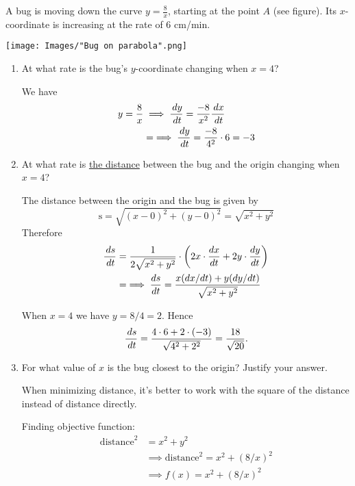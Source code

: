 \documentclass[nooutcomes]{ximera}
\begin{document}
\begin{problem}
  A bug is moving down the curve $y = \frac{8}{x}$, starting at the point $A$ (see figure).
  Its $x$-coordinate is increasing at the rate of 6 cm/min.
  \begin{image}
    \texttt{[image: Images/"Bug on parabola".png]}
  \end{image}
  \begin{enumerate}
    \item
      At what rate is the bug's $y$-coordinate changing when $x = 4$?
      \begin{freeResponse}
        We have
        \begin{align*}
          y = \frac{8}{x} &\implies \frac{\,d y}{\,d t} = \frac{-8}{x^2} \frac{\,d x}{\,d t} \\
          &= \implies \frac{\,d y}{\,d t} = \frac{-8}{4^2} \cdot 6 = -3
        \end{align*}
      \end{freeResponse}

    \item
      At what rate is \underline{the distance} between the bug and the origin changing when $x = 4$?
      \begin{freeResponse}
        The distance between the origin and the bug is given by
        \[
          \text{s} = \sqrt{(x- 0)^2 + (y - 0)^2} = \sqrt{x^2 + y^2}
        \]
        Therefore
        \begin{align*}
          \frac{\,d s}{\,d t} &= \frac{1}{2\sqrt{x^2+y^2}}\cdot \left(2 x \cdot \frac{dx}{dt} + 2y \cdot\frac{dy}{dt}\right) \\
          &= \implies \frac{ds}{dt} = \frac{x (dx/dt) + y (dy/dt)}{\sqrt{x^2+y^2}}
        \end{align*}

        When $x = 4$ we have $y = 8/4 = 2$.
        Hence
        \[
          \frac{\,d s}{\,d t} = \frac{4 \cdot 6 + 2 \cdot (-3)}{\sqrt{4^2 + 2^2}} = \frac{18}{\sqrt{20}}.
        \]
      \end{freeResponse}

    \item
      For what value of $x$ is the bug closest to the origin?
      Justify your answer.
      \begin{freeResponse}
        When minimizing distance, it's better to work with the square of the distance instead of distance directly.

        Finding objective function:
        \begin{align*}
          \text{distance}^2 &= x^2 + y^2 \\
          &\implies \text{distance}^2 = x^2 + (8/x)^2\\
          &\implies f(x) =  x^2 + (8/x)^2
        \end{align*}


\end{freeResponse}
\end{enumerate}
\end{problem}
\end{document}
